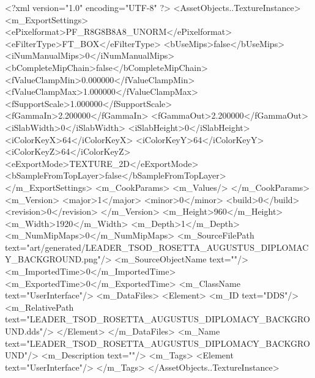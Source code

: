 <?xml version="1.0" encoding="UTF-8" ?>
<AssetObjects..TextureInstance>
	<m_ExportSettings>
		<ePixelformat>PF_R8G8B8A8_UNORM</ePixelformat>
		<eFilterType>FT_BOX</eFilterType>
		<bUseMips>false</bUseMips>
		<iNumManualMips>0</iNumManualMips>
		<bCompleteMipChain>false</bCompleteMipChain>
		<fValueClampMin>0.000000</fValueClampMin>
		<fValueClampMax>1.000000</fValueClampMax>
		<fSupportScale>1.000000</fSupportScale>
		<fGammaIn>2.200000</fGammaIn>
		<fGammaOut>2.200000</fGammaOut>
		<iSlabWidth>0</iSlabWidth>
		<iSlabHeight>0</iSlabHeight>
		<iColorKeyX>64</iColorKeyX>
		<iColorKeyY>64</iColorKeyY>
		<iColorKeyZ>64</iColorKeyZ>
		<eExportMode>TEXTURE_2D</eExportMode>
		<bSampleFromTopLayer>false</bSampleFromTopLayer>
	</m_ExportSettings>
	<m_CookParams>
		<m_Values/>
	</m_CookParams>
	<m_Version>
		<major>1</major>
		<minor>0</minor>
		<build>0</build>
		<revision>0</revision>
	</m_Version>
	<m_Height>960</m_Height>
	<m_Width>1920</m_Width>
	<m_Depth>1</m_Depth>
	<m_NumMipMaps>0</m_NumMipMaps>
	<m_SourceFilePath text="art/generated/LEADER_TSOD_ROSETTA_AUGUSTUS_DIPLOMACY_BACKGROUND.png"/>
	<m_SourceObjectName text=""/>
	<m_ImportedTime>0</m_ImportedTime>
	<m_ExportedTime>0</m_ExportedTime>
	<m_ClassName text="UserInterface"/>
	<m_DataFiles>
		<Element>
			<m_ID text="DDS"/>
			<m_RelativePath text="LEADER_TSOD_ROSETTA_AUGUSTUS_DIPLOMACY_BACKGROUND.dds"/>
		</Element>
	</m_DataFiles>
	<m_Name text="LEADER_TSOD_ROSETTA_AUGUSTUS_DIPLOMACY_BACKGROUND"/>
	<m_Description text=""/>
	<m_Tags>
		<Element text="UserInterface"/>
	</m_Tags>
</AssetObjects..TextureInstance>
